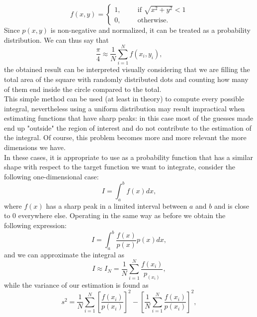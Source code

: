 \begin{equation}
    f(x,y)=
    \begin{cases}
    1,\hspace{1cm}\text{if }\sqrt{x^2+y^2}<1\\
    0,\hspace{1cm}\text{otherwise}.    
    \end{cases}
\end{equation}
Since $p(x,y)$ is non-negative and normalized, it can be treated as a probability distribution. We can thus say that
\begin{equation}
    \frac{\pi}{4}\approx \frac{1}{N}\sum_{i=1}^N f(x_i,y_i),
\end{equation}
the obtained result can be interpreted visually considering that we are filling the total area of the square with randomly distributed dots 
and counting how many of them end inside the circle compared to the total.\\
This simple method can be used (at least in theory) to compute every possible integral, nevertheless using a uniform distribution may 
result impractical when estimating functions that have sharp peaks: in this case most of the guesses made end up "outside" the region of interest 
and do not contribute to the estimation of the integral. Of course, this problem becomes more and more relevant the more dimensions we have.\\
In these cases, it is appropriate to use as a probability function that has a similar shape with respect to the target function we want to 
integrate, consider the following one-dimensional case:
\begin{equation}
    I=\int_{a}^{b}f(x)dx,
\end{equation}
where $f(x)$ has a sharp peak in a limited interval between $a$ and $b$ and is close to 0 everywhere else. Operating in the same 
way as before we obtain the following expression:
\begin{equation}
    I=\int_{a}^{b}\frac{f(x)}{p(x)}p(x)dx,
\end{equation}
and we can approximate the integral as
\begin{equation}
    I\approx I_N=\frac{1}{N}\sum_{i=1}^N\frac{f(x_i)}{p_(x_i)},
\end{equation}
while the variance of our estimation is found as 
\begin{equation}
    s^2=\frac{1}{N}\sum_{i=1}^N\left[\frac{f(x_i)}{p(x_i)}\right]^2-\left[\frac{1}{N}\sum_{i=1}^N\frac{f(x_i)}{p(x_i)}\right]^2,
\end{equation}
